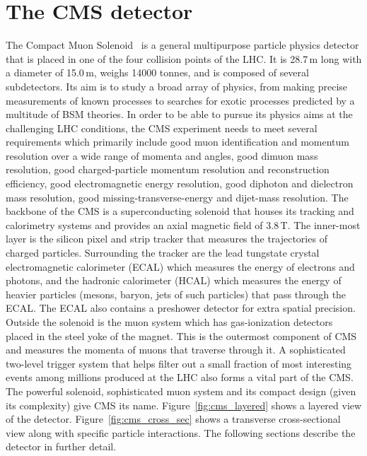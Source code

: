\section{The CMS detector}
\label{sec:CMS}
The Compact Muon Solenoid~\cite{cms_exp_ref} is a general multipurpose particle physics detector that is placed in one of the four collision points of the LHC. It is 28.7\,m long with a diameter of 15.0\,m, weighs 14000 tonnes, and is composed of several subdetectors. Its aim is to study a broad array of physics, from making precise measurements of known processes to searches for exotic processes predicted by a multitude of BSM theories. In order to be able to pursue its physics aims at the challenging LHC conditions, the CMS experiment needs to meet several requirements which primarily include good muon identification and momentum resolution over a wide range of momenta and angles, good dimuon mass resolution, good charged-particle momentum resolution and reconstruction efficiency, good electromagnetic energy resolution, good diphoton and dielectron mass resolution, good missing-transverse-energy and dijet-mass resolution.
The backbone of the CMS is a superconducting solenoid that houses its tracking and calorimetry systems and provides an axial magnetic field of 3.8\,T. The inner-most layer is the silicon pixel and strip tracker that measures the trajectories of charged particles. Surrounding the tracker are the lead tungstate crystal electromagnetic calorimeter (ECAL) which measures the energy of electrons and photons, and the hadronic calorimeter (HCAL) which measures the energy of heavier particles (mesons, baryon, jets of such particles) that pass through the ECAL. The ECAL also contains a preshower detector for extra spatial precision. Outside the solenoid is the muon system which has gas-ionization detectors placed in the steel yoke of the magnet. This is the outermost component of CMS and measures the momenta of muons that traverse through it. A sophisticated two-level trigger system that helps filter out a small fraction of most interesting events among millions produced at the LHC also forms a vital part of the CMS. The powerful solenoid, sophisticated muon system and its compact design (given its complexity) give CMS its name. Figure~\ref{fig:cms_layered} shows a layered view of the detector. Figure~\ref{fig:cms_cross_sec} shows a transverse cross-sectional view along with specific particle interactions. The following sections describe the detector in further detail.   


